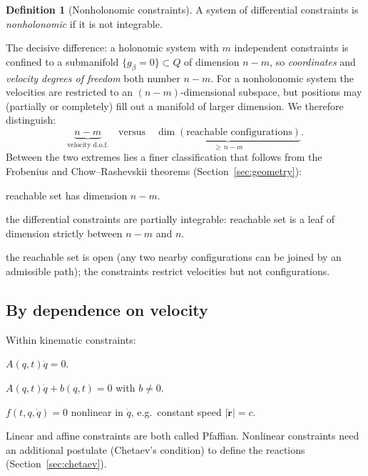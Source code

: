 \documentclass[11pt,a4paper]{article}
\theoremstyle{definition}
\newtheorem{definition}{Definition}[section]
\theoremstyle{plain}
\theoremstyle{remark}
\begin{document}
\begin{definition}[Nonholonomic constraints]
A system of differential constraints is \emph{nonholonomic} if it is not integrable.
\end{definition}

The decisive difference: a holonomic system with $m$ independent constraints is confined
to a submanifold $\{g_\beta=0\}\subset Q$ of dimension $n-m$, so \emph{coordinates} and
\emph{velocity degrees of freedom} both number $n-m$. For a nonholonomic system the
velocities are restricted to an $(n-m)$-dimensional subspace, but positions may
(partially or completely) fill out a manifold of larger dimension. We therefore
distinguish:
\[
  \underbrace{n-m}_{\text{velocity d.o.f.}}\quad\text{versus}\quad
  \underbrace{\dim(\text{reachable configurations})}_{\ge\, n-m}.
\]
Between the two extremes lies a finer classification that follows from the Frobenius and
Chow--Rashevskii theorems (Section~\ref{sec:geometry}):
\begin{description}[leftmargin=1.2em,style=nextline]
\item[Holonomic (integrable)] reachable set has dimension $n-m$.
\item[Partially nonholonomic (mixed)] the differential constraints are partially
  integrable: reachable set is a leaf of dimension strictly between $n-m$ and $n$.
\item[Completely nonholonomic] the reachable set is open (any two nearby configurations can
  be joined by an admissible path); the constraints restrict velocities but not
  configurations.
\end{description}

\subsection{By dependence on velocity}
Within kinematic constraints:
\begin{description}[leftmargin=1.2em,style=nextline]
\item[Linear homogeneous] $A(q,t)\dot q=0$.
\item[Affine (linear inhomogeneous)] $A(q,t)\dot q+b(q,t)=0$ with $b\ne0$.
\item[Nonlinear] $f(t,q,\dot q)=0$ nonlinear in $\dot q$, e.g.\ constant speed $|\dot{\mathbf r}|=c$.
\end{description}
Linear and affine constraints are both called Pfaffian. Nonlinear constraints need an
additional postulate (Chetaev's condition) to define the reactions
(Section~\ref{sec:chetaev}).
\end{document}
